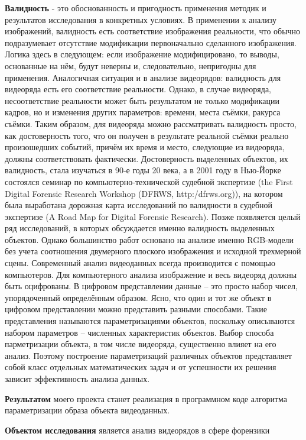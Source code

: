 \documentclass[]{article}
\begin{document}
	\textbf{Валидность} - это обоснованность и пригодность применения методик и результатов исследования в конкретных условиях. В применении к анализу изображений, валидность есть соответствие изображения реальности, что обычно подразумевает отсутствие модификации первоначально сделанного изображения. Логика здесь в следующем: если изображение модифицировано, то выводы, основанные на нём, будут неверны и, следовательно, непригодны для применения. Аналогичная ситуация и в анализе видеорядов: валидность для видеоряда есть его соответствие реальности. Однако, в случае видеоряда, несоответствие реальности может быть результатом не только модификации кадров, но и изменения других параметров: времени, места съёмки, ракурса съёмки. Таким образом, для видеоряда можно рассматривать валидность просто, как достоверность того, что он получен в результате реальной съёмки реально произошедших событий, причём их время и место, следующие из видеоряда, должны соответствовать фактически.
	Достоверность выделенных объектов, их валидность, стала изучаться в 90-е годы 20 века, а в 2001 году в Нью-Йорке состоялся семинар по компьютерно-технической судебной экспертизе (the First Digital Forensic Research Workshop (DFRWS, http:/dfrws.org)), на котором была выработана дорожная карта исследований по валидности в судебной экспертизе (A Road Map for Digital Forensic Research). Позже появляется целый ряд исследований, в которых обсуждается именно валидность выделенных объектов. Однако большинство работ основано на анализе именно RGB-модели без учета соотношения двумерного плоского изображения и исходной трехмерной сцены.
	Современный анализ видеоданных всегда производится с помощью компьютеров. Для компьютерного анализа изображение и весь видеоряд должны быть оцифрованы. В цифровом представлении данные – это просто набор чисел, упорядоченный определённым образом. Ясно, что один и тот же объект в цифровом представлении можно представить разными способами. Такие представления называются параметризациями объектов, поскольку описываются набором параметров – численных характеристик объектов. Выбор способа парметризации объекта, в том числе видеоряда, существенно влияет на его анализ. Поэтому построение параметризаций различных объектов представляет собой класс отдельных математических задач и от успешности их решения зависит эффективность анализа данных. 
	
	\textbf{Результатом} моего проекта станет реализация в программном коде алгоритма параметризации образа объекта видеоданных.
	
	\textbf{Объектом исследования} является анализ видеорядов в сфере форензики
	
\end{document}

